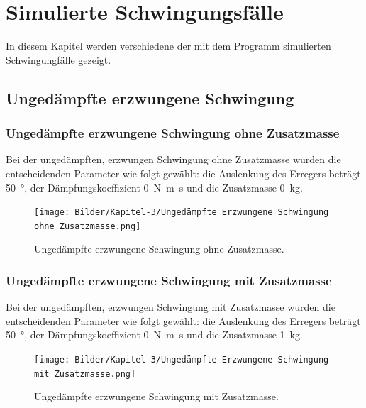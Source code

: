 \chapter{Simulierte Schwingungsfälle}
    In diesem Kapitel werden verschiedene der mit dem Programm simulierten Schwingungfälle gezeigt. 

    \section{Ungedämpfte erzwungene Schwingung}

        \subsection{Ungedämpfte erzwungene Schwingung ohne Zusatzmasse}

            Bei der ungedämpften, erzwungen Schwingung ohne Zusatzmasse wurden die entscheidenden Parameter wie folgt gewählt: die Auslenkung des Erregers beträgt \qty{50}{\degree}, der Dämpfungskoeffizient \qty{0}{\newton\metre\second} und die Zusatzmasse \qty{0}{\kilo\gram}.
            \begin{figure}[htbp]
                \centering
                \texttt{[image: Bilder/Kapitel-3/Ungedämpfte Erzwungene Schwingung ohne Zusatzmasse.png]}
                \caption[Ungedämpfte erzwungene Schwingung ohne Zusatzmasse]{Ungedämpfte erzwungene Schwingung ohne Zusatzmasse.}\label{Ungedämpfte Erzwungene Schwingung ohne Zusatzmasse}
            \end{figure}
            \newpage

        \subsection{Ungedämpfte erzwungene Schwingung mit Zusatzmasse}

            Bei der ungedämpften, erzwungen Schwingung mit Zusatzmasse wurden die entscheidenden Parameter wie folgt gewählt: die Auslenkung des Erregers beträgt \qty{50}{\degree}, der Dämpfungskoeffizient \qty{0}{\newton\metre\second} und die Zusatzmasse  \qty{1}{\kilo\gram}.
            \begin{figure}[htbp]
                \centering
                \texttt{[image: Bilder/Kapitel-3/Ungedämpfte Erzwungene Schwingung mit Zusatzmasse.png]}
                \caption[Ungedämpfte erzwungene Schwingung mit Zusatzmasse]{Ungedämpfte erzwungene Schwingung mit Zusatzmasse.}\label{Ungedämpfte Erzwungene Schwingung mit Zusatzmasse}
            \end{figure}
            \newpage

